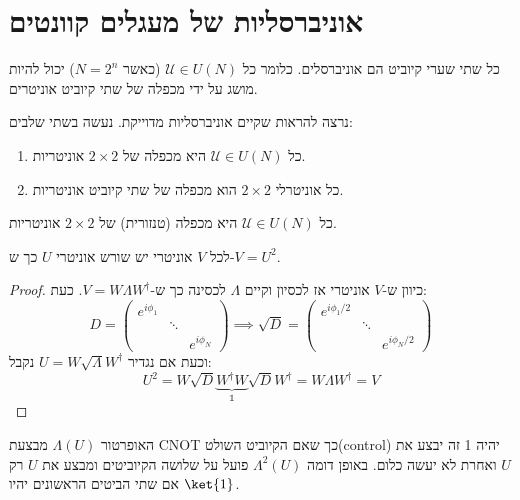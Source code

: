 \documentclass{tstextbook}
\begin{document}
\section{אוניברסליות של מעגלים קוונטים}

\begin{definition}
כל שתי שערי קיוביט הם אוניברסלים. כלומר כל \(\mathcal{U}\in U(N)\) (כאשר \(N=2^{n}\)) יכול להיות מושג על ידי מכפלה של שתי קיוביט אוניטרים.

\end{definition}
נרצה להראות שקיים אוניברסליות מדוייקת. נעשה בשתי שלבים:

\begin{enumerate}
  \item כל \(\mathcal{U}\in U(N)\) היא מכפלה של \(2\times 2\) אוניטריות. 


  \item כל אוניטרלי \(2\times 2\) הוא מכפלה של שתי קיוביט אוניטריות. 


\end{enumerate}
\begin{proposition}
כל \(\mathcal{U}\in U(N)\) היא מכפלה (טנזורית) של \(2\times 2\) אוניטריות.

\end{proposition}
\begin{proposition}
לכל \(V\) אוניטרי יש שורש אוניטרי \(U\) כך ש-\(V=U^{2}\).

\end{proposition}
\begin{proof}
כיוון ש-\(V\) אוניטרי אז לכסיון וקיים \(\Lambda\) לכסינה כך ש-\(V=W\Lambda W^{\dagger}\). כעת:
$$D=\begin{pmatrix}e^{ i\phi_{1}} &  &  \\ & \ddots &  \\ &  & e^{ i\phi_{N} }\end{pmatrix}\implies\sqrt{ D }=\begin{pmatrix}e^{ i\phi_{1}/2} &  &  \\ & \ddots &  \\ &  & e^{ i\phi_{N}/2 }
\end{pmatrix}$$
וכעת אם נגדיר \(U=W\sqrt{ \Lambda }W^{\dagger}\) נקבל:
$$U^{2}=W\sqrt{ D }\underbrace{ W^{\dagger}W }_{ \mathbb{1}  } \sqrt{ D }W^{\dagger}=W\Lambda W^{\dagger}=V$$

\end{proof}
\begin{reminder}
האופרטור \(\Lambda(U)\) מבצעת CNOT כך שאם הקיוביט השולט(control) יהיה 1 זה יבצע את \(U\) ואחרת לא יעשה כלום. באופן דומה \(\Lambda^{2}(U)\) פועל על שלושה הקיוביטים ומבצע את \(U\) רק אם שתי הביטים הראשונים יהיו \(\ket{1}\).

\end{reminder}
\end{document}
